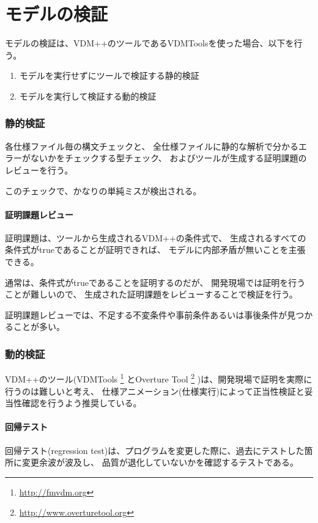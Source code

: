 \section {モデルの検証}
モデルの検証は、VDM++のツールであるVDMToolsを使った場合、以下を行う。

\begin{enumerate}
\item モデルを実行せずにツールで検証する静的検証
\item モデルを実行して検証する動的検証
\end{enumerate}

	\subsubsection {静的検証}
各仕様ファイル毎の構文チェックと、
全仕様ファイルに静的な解析で分かるエラーがないかをチェックする型チェック、
およびツールが生成する証明課題のレビューを行う。

このチェックで、かなりの単純ミスが検出される。

		\paragraph {証明課題レビュー}
証明課題は、ツールから生成されるVDM++の条件式で、
生成されるすべての条件式がtrueであることが証明できれば、
モデルに内部矛盾が無いことを主張できる。

通常は、条件式がtrueであることを証明するのだが、
開発現場では証明を行うことが難しいので、
生成された証明課題をレビューすることで検証を行う。

証明課題レビューでは、不足する不変条件や事前条件あるいは事後条件が見つかることが多い。

	\subsubsection {動的検証}
VDM++のツール(VDMTools
\footnote{\url{http://fmvdm.org}}
とOverture Tool
\footnote{\url{http://www.overturetool.org}}
)は、開発現場で証明を実際に行うのは難しいと考え、
仕様アニメーション(仕様実行)によって正当性検証と妥当性確認を行うよう推奨している。

		\paragraph {回帰テスト}
		\label{sec:回帰テスト}
回帰テスト(regression test)は、プログラムを変更した際に、過去にテストした箇所に変更余波が波及し、
品質が退化していないかを確認するテストである。

